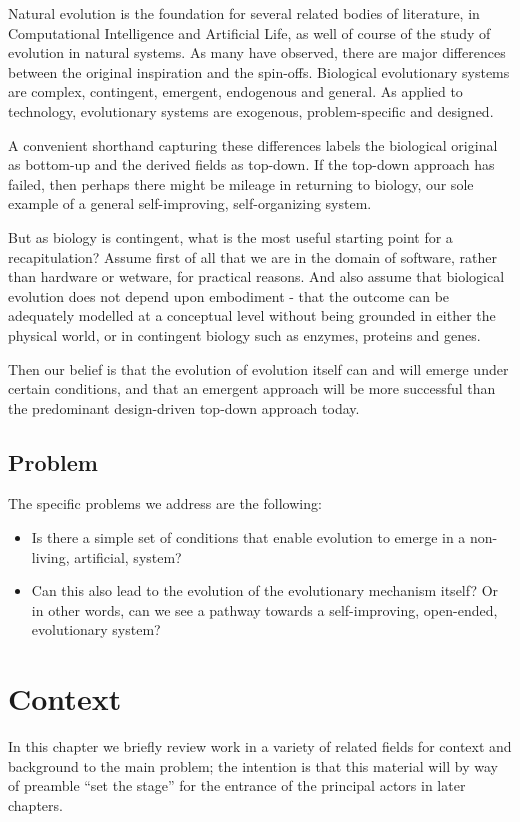 \documentclass[]{report}
\begin{document}
Natural evolution is the foundation for several related bodies of literature, in Computational Intelligence and Artificial Life, as well of course of the study of evolution in natural systems. As many have observed, there are major differences between the original inspiration and the spin-offs. Biological evolutionary systems are complex, contingent, emergent, endogenous and general. As applied to technology, evolutionary systems are exogenous, problem-specific and designed.

A convenient shorthand capturing these differences labels the biological original as bottom-up and the derived fields as top-down. If the top-down approach has failed, then perhaps there might be mileage in returning to biology, our sole example of a general self-improving, self-organizing system.

But as biology is contingent, what is the most useful starting point for a recapitulation? Assume first of all that we are in the domain of software, rather than hardware or wetware, for practical reasons. And also assume that biological evolution does not depend upon embodiment - that the outcome can be adequately modelled at a conceptual level without being grounded in either the physical world, or in contingent biology such as enzymes, proteins and genes.

Then our belief is that the evolution of evolution itself can and will emerge under certain conditions, and that an emergent approach will be more successful than the predominant design-driven top-down approach today.

\section{Problem}
The specific problems we address are the following:
\begin{itemize}
	\item Is there a simple set of conditions that enable evolution to emerge in a non-living, artificial, system?
	\item Can this also lead to the evolution of the evolutionary mechanism itself? Or in other words, can we see a pathway towards a self-improving, open-ended, evolutionary system?
\end{itemize}

\chapter{Context}
In this chapter we briefly review work in a variety of related fields for context and background to the main problem; the intention is that this material will by way of preamble ``set the stage'' for the entrance of the principal actors in later chapters.
\end{document}
